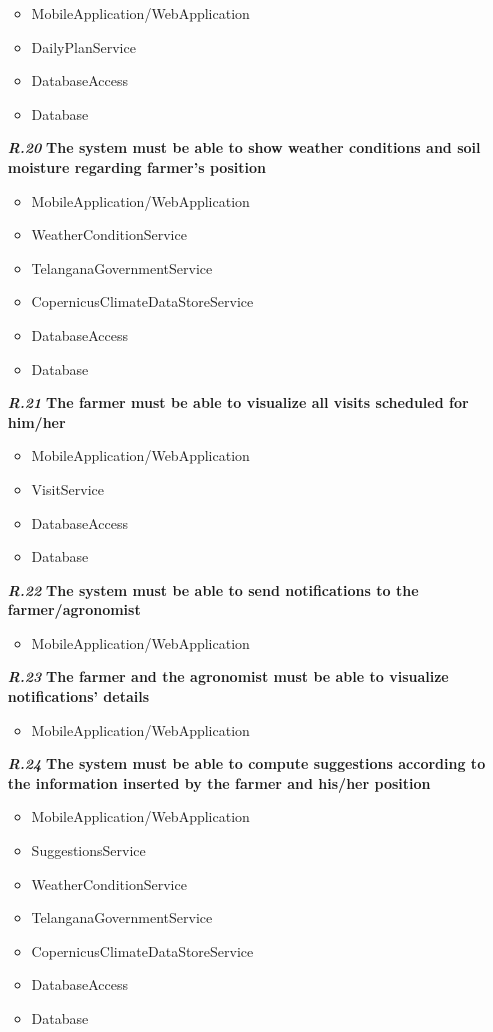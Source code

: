 \begin{itemize}
\begin{itemize}
     \item MobileApplication/WebApplication
     \item DailyPlanService
     \item DatabaseAccess
     \item Database
\end{itemize}  
\item [\textbf{\textit{R.20}}] \textbf{The system must be able to show weather conditions and soil moisture regarding farmer’s position}
  \begin{itemize}
     \item MobileApplication/WebApplication
     \item WeatherConditionService
    \item TelanganaGovernmentService
    \item CopernicusClimateDataStoreService
      \item DatabaseAccess
     \item Database
\end{itemize} 

\item [\textbf{\textit{R.21}}] \textbf{The farmer must be able to visualize all visits scheduled for him/her}
\begin{itemize}
     \item MobileApplication/WebApplication
    \item VisitService
      \item DatabaseAccess
     \item Database
\end{itemize} 

\item [\textbf{\textit{R.22}}] \textbf{The system must be able to send notifications to the farmer/agronomist}
\begin{itemize}
     \item MobileApplication/WebApplication
\end{itemize} 

\item [\textbf{\textit{R.23}}] \textbf{The farmer and the agronomist must be able to visualize notifications’ details}
\begin{itemize}
     \item MobileApplication/WebApplication
\end{itemize} 

\item [\textbf{\textit{R.24}}] \textbf{The system must be able to compute suggestions according to the information inserted by the farmer and his/her position}
\begin{itemize}
     \item MobileApplication/WebApplication
     \item SuggestionsService
     \item WeatherConditionService
     \item TelanganaGovernmentService
    \item CopernicusClimateDataStoreService
     \item DatabaseAccess
     \item Database
\end{itemize} 


\end{itemize}
